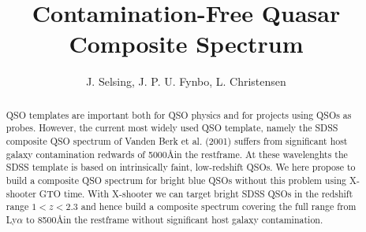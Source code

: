 \documentclass[iop]{emulateapj}
\begin{document}

\title{Contamination-Free Quasar Composite Spectrum}


\author{J. Selsing, J. P. U. Fynbo, L. Christensen}






\begin{abstract}
QSO templates are important both for QSO physics and for projects using QSOs as probes. However, the current most widely used QSO template, namely the SDSS composite QSO spectrum of Vanden Berk et al. (2001) suffers from significant host galaxy contamination redwards of 5000\AA in the restframe. At these wavelenghts the SDSS template is based on intrinsically faint, low-redshift QSOs. We here propose to build a composite QSO spectrum for bright blue QSOs without this problem using X-shooter GTO time. With X-shooter we can target bright SDSS QSOs in the redshift range $1 < z < 2.3$ and hence build a composite spectrum covering the full range from Ly$\alpha$ to 8500\AA in the restframe without significant host galaxy contamination.

\end{abstract}
\end{document}
